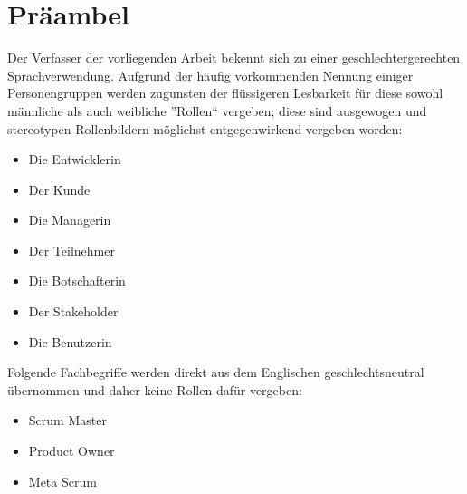 \newpage
\chapter*{Präambel}

Der Verfasser der vorliegenden Arbeit bekennt sich zu einer geschlechtergerechten Sprachverwendung. Aufgrund der häufig vorkommenden Nennung einiger Personengruppen werden zugunsten der flüssigeren Lesbarkeit für diese sowohl männliche als auch weibliche ”Rollen“ vergeben; diese sind ausgewogen und stereotypen Rollenbildern möglichst entgegenwirkend vergeben worden:

\begin{itemize}
    \item Die Entwicklerin
    \item Der Kunde
    \item Die Managerin
    \item Der Teilnehmer
    \item Die Botschafterin
    \item Der Stakeholder
    \item Die Benutzerin
\end{itemize}

Folgende Fachbegriffe werden direkt aus dem Englischen geschlechtsneutral übernommen und daher keine Rollen dafür vergeben:

\begin{itemize}
    \item Scrum Master
    \item Product Owner
    \item Meta Scrum
\end{itemize}
